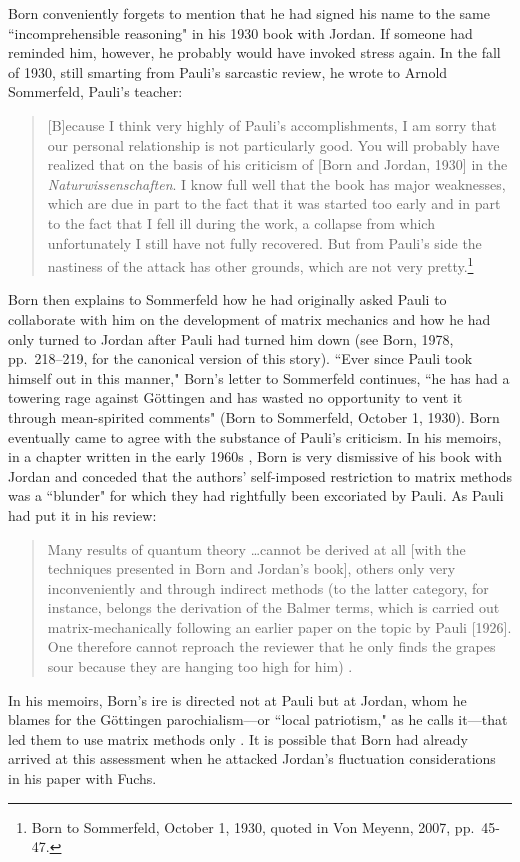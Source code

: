 \documentclass[12pt]{elsart}
\begin{document}
Born conveniently forgets to mention that he had signed his name to the same ``incomprehensible reasoning" in his 1930 book with Jordan. If someone had reminded him, however, he probably would have invoked stress again. In the fall of 1930, still smarting from Pauli's sarcastic review, he wrote to Arnold Sommerfeld, Pauli's teacher:
\begin{quotation}
[B]ecause I think very highly of Pauli's accomplishments, I am sorry that our personal relationship is not particularly good. You will probably have realized that on the basis of his criticism of  [Born and Jordan, 1930] in the {\it Naturwissenschaften}. I know full well that the book has major weaknesses, which are due in part to the fact that it was started too early and in part to the fact that I fell ill during the work, a collapse from which unfortunately I still have not fully recovered. But from Pauli's side the nastiness of the attack has other grounds, which are not very pretty.\footnote{Born to Sommerfeld, October 1, 1930, quoted in Von Meyenn, 2007, pp.\ 45-47.}
\end{quotation}
Born then explains to Sommerfeld how he had originally asked Pauli to collaborate with him on the development of matrix mechanics and how he had only turned to Jordan after Pauli had turned him down (see Born, 1978, pp.\ 218--219, for the canonical version of this story). ``Ever since Pauli took himself out in this manner," Born's letter to Sommerfeld continues, ``he has had a towering rage against G\"ottingen and has wasted no opportunity to vent it through mean-spirited comments" (Born to Sommerfeld, October 1, 1930). Born eventually came to agree with the substance of Pauli's criticism.
In his memoirs, in a chapter written in the early 1960s  \citep[p.\ 225]{Born 1978}, Born is very dismissive of his book with Jordan and conceded that the authors' self-imposed restriction to matrix methods was a ``blunder" for which they had rightfully been excoriated by Pauli. As Pauli had put it in his review:
\begin{quotation}
Many results of quantum theory \ldots cannot be derived at all [with the techniques presented in Born and Jordan's book], others only very inconveniently and through indirect methods (to the latter category, for instance, belongs the derivation of the Balmer terms, which is carried out matrix-mechanically following an earlier paper on the topic by Pauli [1926]. One therefore cannot reproach the reviewer that he only finds the grapes sour because they are hanging too high for him) \citep{Pauli 1930}.
\end{quotation}
In his memoirs, Born's ire is directed not at Pauli but at Jordan, whom he blames for the G\"ottingen parochialism---or ``local patriotism," as he calls it---that led them to use matrix methods only \citep[p.\ 230]{Born 1978}. It is possible that Born had already arrived at this assessment when he attacked Jordan's fluctuation considerations in his paper with Fuchs. 
\end{document}
